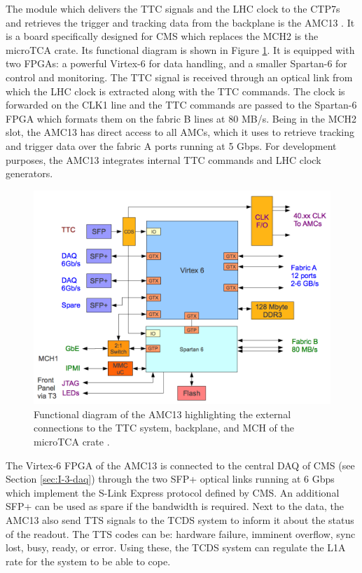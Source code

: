       The module which delivers the TTC signals and the LHC clock to the CTP7s and retrieves the trigger and tracking data from the backplane is the AMC13 \cite{AMC13}. It is a board specifically designed for CMS which replaces the MCH2 is the microTCA crate. Its functional diagram is shown in Figure \ref{fig:II-2-amc13}. It is equipped with two FPGAs: a powerful Virtex-6 for data handling, and a smaller Spartan-6 for control and monitoring. The TTC signal is received through an optical link from which the LHC clock is extracted along with the TTC commands. The clock is forwarded on the CLK1 line and the TTC commands are passed to the Spartan-6 FPGA which formats them on the fabric B lines at 80 MB/s. Being in the MCH2 slot, the AMC13 has direct access to all AMCs, which it uses to retrieve tracking and trigger data over the fabric A ports running at 5 Gbps. For development purposes, the AMC13 integrates internal TTC commands and LHC clock generators. \\

      \begin{figure}[h!]
        \centering
        \includegraphics[width=\textwidth]{img/II-2-daq/amc13.png}
        \caption{Functional diagram of the AMC13 highlighting the external connections to the TTC system, backplane, and MCH of the microTCA crate \cite{AMC13}.}
        \label{fig:II-2-amc13}
      \end{figure}

      The Virtex-6 FPGA of the AMC13 is connected to the central DAQ of CMS (see Section \ref{sec:I-3-daq}) through the two SFP+ optical links running at 6 Gbps which implement the S-Link Express protocol defined by CMS. An additional SFP+ can be used as spare if the bandwidth is required. Next to the data, the AMC13 also send TTS signals to the TCDS system to inform it about the status of the readout. The TTS codes can be: hardware failure, imminent overflow, sync lost, busy, ready, or error. Using these, the TCDS system can regulate the L1A rate for the system to be able to cope.


